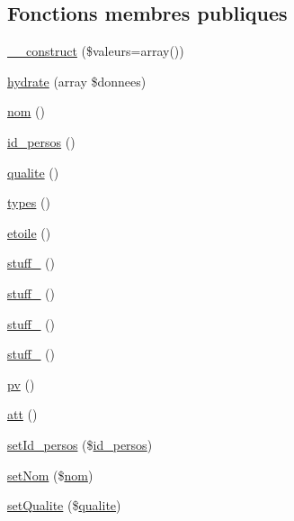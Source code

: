 \subsection*{Fonctions membres publiques}
\begin{DoxyCompactItemize}
\item 
\mbox{\hyperlink{class_base__personnage_adc8ce28bfa1d2fffd9e568fbb25a0104}{\+\_\+\+\_\+construct}} (\$valeurs=array())
\item 
\mbox{\hyperlink{class_base__personnage_a100783dd2f191636d3eab860a60c18f6}{hydrate}} (array \$donnees)
\item 
\mbox{\hyperlink{class_base__personnage_abd3b2c38016dc7f95b967225d4dfbd17}{nom}} ()
\item 
\mbox{\hyperlink{class_base__personnage_ab840c279a1234075b5598b6bc48c0288}{id\+\_\+persos}} ()
\item 
\mbox{\hyperlink{class_base__personnage_a77daa43282aa9b4653c70b4a97dc7948}{qualite}} ()
\item 
\mbox{\hyperlink{class_base__personnage_a24e406f1e1d2c35596ccd5a6627c5650}{types}} ()
\item 
\mbox{\hyperlink{class_base__personnage_a17546eb34101fa1d501e84309f3f806c}{etoile}} ()
\item 
\mbox{\hyperlink{class_base__personnage_aad70521301b01ab3918bea05bef7b54b}{stuff\+\_}} ()
\item 
\mbox{\hyperlink{class_base__personnage_ae37a88e0e1535ff5f0d786c1007fbe1e}{stuff\+\_}} ()
\item 
\mbox{\hyperlink{class_base__personnage_a901d3c830ec965886fcf9c57ff153675}{stuff\+\_}} ()
\item 
\mbox{\hyperlink{class_base__personnage_afb797796a81d9bec991ede838c711bd6}{stuff\+\_}} ()
\item 
\mbox{\hyperlink{class_base__personnage_a2b94389a8a3b5538c0b01e36f3ca55bf}{pv}} ()
\item 
\mbox{\hyperlink{class_base__personnage_ad09642245bba8747d0ebd3ab991c66b9}{att}} ()
\item 
\mbox{\hyperlink{class_base__personnage_a14498c5c6a7ced9420401351eacf2ecf}{set\+Id\+\_\+persos}} (\$\mbox{\hyperlink{class_base__personnage_ab840c279a1234075b5598b6bc48c0288}{id\+\_\+persos}})
\item 
\mbox{\hyperlink{class_base__personnage_a44eae499b82470a6c99e01b68a73a6d9}{set\+Nom}} (\$\mbox{\hyperlink{class_base__personnage_abd3b2c38016dc7f95b967225d4dfbd17}{nom}})
\item 
\mbox{\hyperlink{class_base__personnage_a05dbaa079c1220db181bd98a204ffead}{set\+Qualite}} (\$\mbox{\hyperlink{class_base__personnage_a77daa43282aa9b4653c70b4a97dc7948}{qualite}})

\end{DoxyCompactItemize}
